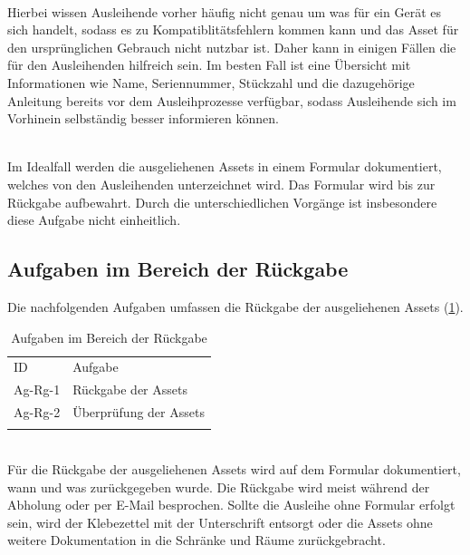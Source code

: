         {\sffamily\color{maincolor}{Ag-Au-2 | Erläuterung der Assetnutzung}}\\
Hierbei wissen Ausleihende vorher häufig nicht genau um was für ein Gerät es sich handelt, sodass es
zu Kompatiblitätsfehlern kommen kann und das Asset für den ursprünglichen Gebrauch nicht nutzbar
ist. Daher kann in einigen Fällen die für den Ausleihenden hilfreich sein. Im besten Fall ist eine
Übersicht mit Informationen wie Name, Seriennummer, Stückzahl und die dazugehörige Anleitung bereits
vor dem Ausleihprozesse verfügbar, sodass Ausleihende sich im Vorhinein selbständig besser
informieren können.

{\sffamily\color{maincolor}{Ag-Au-3 | Unterschreiben des Formulars}}\\
Im Idealfall werden die ausgeliehenen Assets in einem Formular dokumentiert, welches von den
Ausleihenden unterzeichnet wird. Das Formular wird bis zur Rückgabe aufbewahrt. Durch die
unterschiedlichen Vorgänge ist insbesondere diese Aufgabe nicht einheitlich.

\subsection{Aufgaben im Bereich der Rückgabe}
Die nachfolgenden Aufgaben umfassen die Rückgabe der ausgeliehenen Assets (\ref{table:Ag-Rg}).
\begin{table}[h]
        \centering
        \caption{Aufgaben im Bereich der Rückgabe}
        \begin{tabular}{ll}
                \arrayrulecolor{maincolor}\hline
                \sffamily\color{maincolor}ID & \sffamily\color{maincolor}Aufgabe \\
                \arrayrulecolor{maincolor}\hline
                Ag-Rg-1                      & Rückgabe der Assets               \\
                Ag-Rg-2                      & Überprüfung der Assets            \\
                \arrayrulecolor{maincolor}\hline
        \end{tabular}
        \label{table:Ag-Rg}
\end{table}

{\sffamily\color{maincolor}{Ag-Rg-1 | Rückgabe der Assets}} \\
Für die Rückgabe der ausgeliehenen Assets wird auf dem Formular dokumentiert, wann
und was zurückgegeben wurde. Die Rückgabe wird meist während der Abholung oder per E-Mail
besprochen. Sollte die Ausleihe ohne Formular erfolgt sein, wird der Klebezettel mit der
Unterschrift entsorgt oder die Assets ohne weitere Dokumentation in die Schränke und Räume
zurückgebracht.

